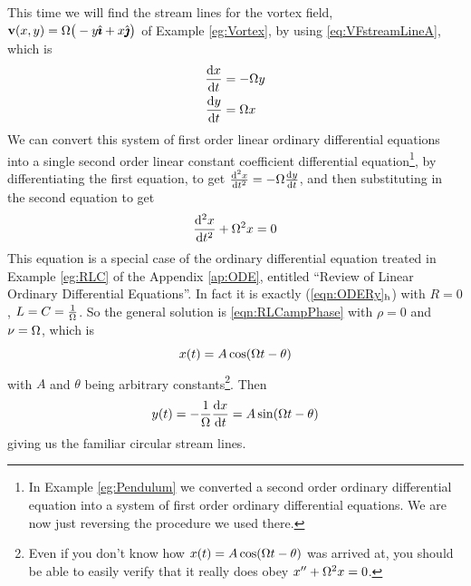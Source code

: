 \begin{eg}[Stream lines for the vortex field
using $\vr'(t)=\vv(\vr(t))$]\label{eg:vortexStreamEqual}
This time we will find the stream lines for the vortex field, 
$\mathbf{v}(x,y) = \Omega\big(-y\hat{\pmb{\imath}} +x\hat{\pmb{\jmath}}\big)$ of Example \ref{eg:Vortex},
by using \eqref{eq:VFstreamLineA}, which is
\begin{align*}
\diff{x}{t} &= -\Om y \\
\diff{y}{t} &= \Om x 
\end{align*}
We can convert this system of first
order linear ordinary differential equations
into a single second order linear constant coefficient
differential equation\footnote{In Example \ref{eg:Pendulum} we converted a second order ordinary differential equation into a system of first
order ordinary differential equations. We are now just reversing
the procedure we used there.}, by differentiating 
the first equation, to get $\difftwo{x}{t} = -\Om\diff{y}{t}$,
and then substituting in the second equation to get
\begin{equation*}
\difftwo{x}{t} + \Om^2 x = 0
\end{equation*}
This equation is a special case of the ordinary differential equation
treated in Example \ref{eg:RLC} of the Appendix \ref{ap:ODE}, entitled
``Review of Linear Ordinary Differential Equations''.  In fact it is
exactly (\ref{eqn:ODERy}$_{\rm h}$) with $R=0$, $L=C=\frac{1}{\Omega}$. So
the general solution is \eqref{eqn:RLCampPhase} with 
$\rho=0$ and $\nu=\Omega$, which is
\begin{equation*}
x(t) = A\cos(\Omega t-\theta)
\end{equation*} 
with $A$ and $\theta$ being arbitrary constants\footnote{Even if you
don't know how $x(t) = A\cos(\Omega t-\theta)$ was arrived at, you should
be able to easily verify that it really does obey $x''+\Omega^2 x=0$.}. Then
\begin{equation*}
y(t) = -\frac{1}{\Om}\diff{x}{t} =A\sin(\Om t-\theta)
\end{equation*}
giving us the familiar circular stream lines.
\end{eg}

